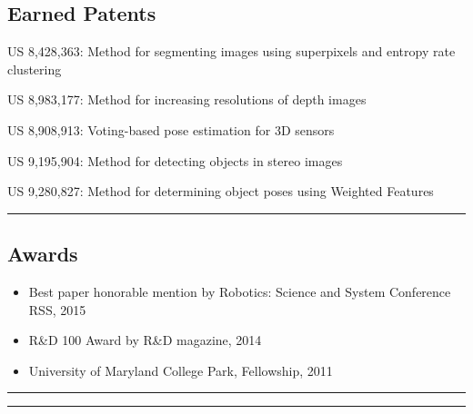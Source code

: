 \documentclass[10pt,letterpaper]{article}
\begin{document}
\subsection*{Earned Patents}
\begin{itemize*}
\item US 8,428,363: Method for segmenting images using superpixels and entropy rate clustering
\item US 8,983,177: Method for increasing resolutions of depth images
\item US 8,908,913: Voting-based pose estimation for 3D sensors
\item US 9,195,904: Method for detecting objects in stereo images
\item US 9,280,827: Method for determining object poses using Weighted Features
\end{itemize*}

\hrule
\vspace{-0.4em}
\subsection*{Awards}
\begin{itemize}
\item Best paper honorable mention by Robotics: Science and System Conference RSS, 2015\vspace{-2mm}
\item R\&D 100 Award by R\&D magazine, 2014\vspace{-2mm}
\item University of Maryland College Park, Fellowship, 2011
\end{itemize}
\hrule
\clearpage

\hrule
\vspace{-0.4em}
\end{document}
